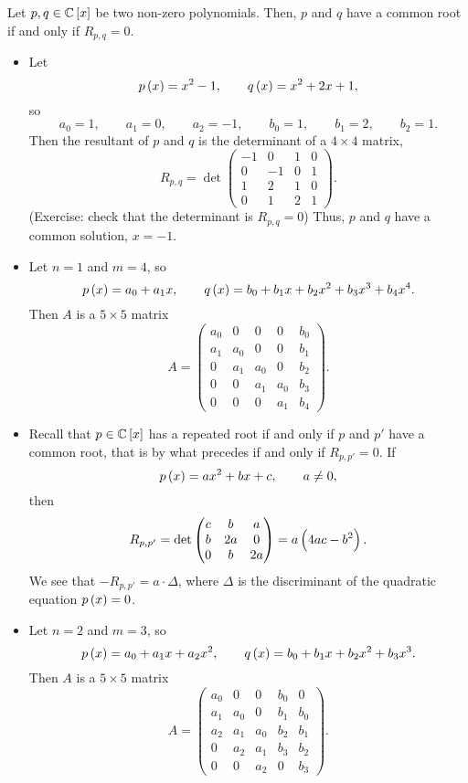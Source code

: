 \begin{theorem}
\label{thm:9.3}
Let $ p, q \in \C\sbr{x} $ be two non-zero polynomials. Then, $ p $ and $ q $ have a common root if and only if $ R_{p, q} = 0 $.
\end{theorem}

\begin{example}
\hfill
\begin{itemize}
\item Let
$$ p\br{x} = x^2 - 1, \qquad q\br{x} = x^2 + 2x + 1, $$
so
$$ a_0 = 1, \qquad a_1 = 0, \qquad a_2 = -1, \qquad b_0 = 1, \qquad b_1 = 2, \qquad b_2 = 1. $$
Then the resultant of $ p $ and $ q $ is the determinant of a $ 4 \times 4 $ matrix,
$$ R_{p, q} = \det
\begin{pmatrix}
-1 & 0 & 1 & 0 \\
0 & -1 & 0 & 1 \\
1 & 2 & 1 & 0 \\
0 & 1 & 2 & 1
\end{pmatrix}.
$$
(Exercise: check that the determinant is $ R_{p, q} = 0 $) Thus, $ p $ and $ q $ have a common solution, $ x = -1 $.

\pagebreak

\item Let $ n = 1 $ and $ m = 4 $, so
$$ p\br{x} = a_0 + a_1x, \qquad q\br{x} = b_0 + b_1x + b_2x^2 + b_3x^3 + b_4x^4. $$
Then $ A $ is a $ 5 \times 5 $ matrix
$$ A =
\begin{pmatrix}
a_0 & 0 & 0 & 0 & b_0 \\
a_1 & a_0 & 0 & 0 & b_1 \\
0 & a_1 & a_0 & 0 & b_2 \\
0 & 0 & a_1 & a_0 & b_3 \\
0 & 0 & 0 & a_1 & b_4
\end{pmatrix}.
$$
\item Recall that $ p \in \C\sbr{x} $ has a repeated root if and only if $ p $ and $ p' $ have a common root, that is by what precedes if and only if $ R_{p, p'} = 0 $. If
$$ p\br{x} = ax^2 + bx + c, \qquad a \ne 0, $$
then
$$ R_{p, p'} = \det\threebythree{c}{b}{a}{b}{2a}{0}{0}{b}{2a} = a\br{4ac - b^2}. $$
We see that $ -R_{p, p'} = a \cdot \Delta $, where $ \Delta $ is the discriminant of the quadratic equation $ p\br{x} = 0 $.
\item Let $ n = 2 $ and $ m = 3 $, so
$$ p\br{x} = a_0 + a_1x + a_2x^2, \qquad q\br{x} = b_0 + b_1x + b_2x^2 + b_3x^3. $$
Then $ A $ is a $ 5 \times 5 $ matrix
$$ A =
\begin{pmatrix}
a_0 & 0 & 0 & b_0 & 0 \\
a_1 & a_0 & 0 & b_1 & b_0 \\
a_2 & a_1 & a_0 & b_2 & b_1 \\
0 & a_2 & a_1 & b_3 & b_2 \\
0 & 0 & a_2 & 0 & b_3
\end{pmatrix}.
$$
\end{itemize}
\end{example}

